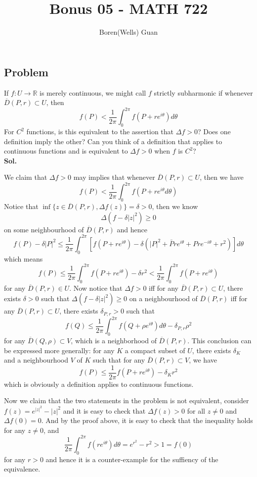 \documentclass[lang=en,11pt,a4paper,citestyle =authoryear]{elegantpaper}
\title{Bonus 05 - MATH 722}
\author{Boren(Wells) Guan}
\newcommand{\R}{\mathbb{R}}
\begin{document}
\maketitle

\subsection*{Problem} 
If $f:U\to\R$ is merely continuous, we might call $f$ strictly subharmonic if whenever $\overline{D}(P,r) \subset U$, then
\[f(P) < \dfrac{1}{2\pi} \int_0^{2\pi}f(P+re^{i\theta})d\theta\]
For $C^2$ functions, is this equivalent to the assertion that $\Delta f >0$? Does one definition imply the other? Can you think of a definition that applies to continuous functions and is equivalent to $\Delta f > 0$ when $f$ is $C^2$?
\vspace{0.5em}\\
\textbf{Sol.} \par
We claim that $\Delta f > 0$ may implies that whenever $\overline{D}(P,r)\subset U$, then we have
\[
f(P) < \dfrac{1}{2\pi} \int_0^{2\pi} f(P+re^{i\theta}d\theta)
\]
Notice that $\inf\{z\in \overline{D}(P,r), \Delta f(z)\} = \delta > 0$, then we know
\[\Delta(f-\delta|z|^2) \geq 0\]
on some neighbourhood of $\overline{D}(P,r)$ and hence
\[
f(P)-\delta|P|^2 \leq \dfrac{1}{2\pi} \int_0^{2\pi} [f(P+re^{i\theta}) - \delta(|P|^2 + \bar{P}re^{i\theta} + Pre^{-i\theta} + r^2)] d\theta
\] 
which means
\[
f(P) \leq \dfrac{1}{2\pi}\int_0^{2\pi} f(P+re^{i\theta}) - \delta r^2 < \dfrac{1}{2\pi}\int_0^{2\pi} f(P+re^{i\theta})
\]
for any $\overline{D}(P,r)\in U$. Now notice that $\Delta f > 0$ iff for any $\overline{D}(P,r)\subset U$, there exists $\delta > 0$ such that $\Delta (f-\delta|z|^2) \geq 0$ on a neighbourhood of $\overline{D}(P,r)$ iff for any $\overline{D}(P,r)\subset U$, there exists $\delta_{P,r} > 0$ such that
\[
f(Q) \leq \dfrac{1}{2\pi} \int_0^{2\pi} f(Q+\rho e^{i\theta})d\theta - \delta_{P,r} \rho^2 
\]
for any $\overline{D}(Q,\rho) \subset V$, which is a neighborhood of $\overline{D}(P,r)$. This conclusion can be expressed more generally: for any $K$ a compact subset of $U$, there exists $\delta_K$ and a neighbourhood $V$ of $K$ such that for any $\overline{D}(P,r)\subset V$, we have
\[f(P) \leq \dfrac{1}{2\pi} f(P+re^{i\theta}) - \delta_Kr^2\]
which is obviously a definition applies to continuous functions.\par
Now we claim that the two statements in the problem is not equivalent, consider $f(z) = e^{|z|^2} - |z|^2$ and it is easy to check that $\Delta f(z) > 0$ for all $z\neq 0$ and $\Delta f(0) = 0$. And by the proof above, it is easy to check that the inequality holds for any $z\neq 0$, and 
\[\dfrac{1}{2\pi} \int_0^{2\pi}f(re^{i\theta})d\theta = e^{r^2}-r^2 > 1 = f(0)\]
for any $r>0$ and hence it is a counter-example for the suffiency of the equivalence.
\vspace{0.5em}

\addappheadtotoc
\end{document}
